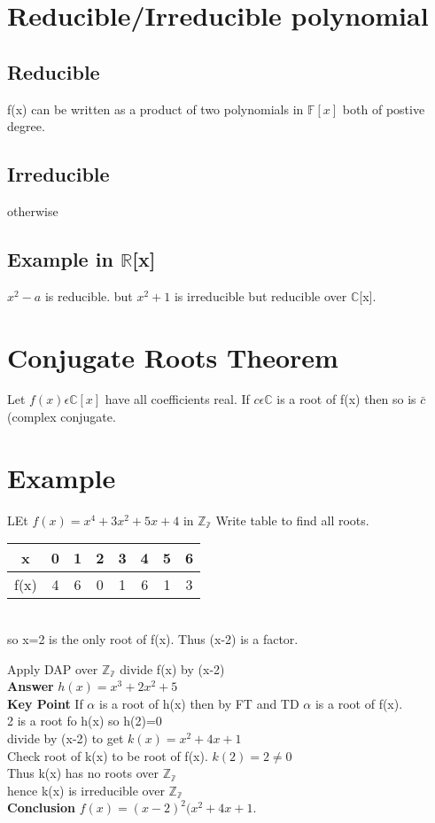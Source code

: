\documentclass{article}
\begin{document}
\section{Reducible/Irreducible polynomial}
\subsection{Reducible}
f(x) can be written as a product of two polynomials in $\mathbb{F}[x]$ both of
postive degree.
\subsection{Irreducible}
otherwise
\subsection{Example in $\mathbb{R}$[x]}
$x^2-a$ is reducible. but $x^2+1$ is irreducible but reducible over $\mathbb{C}$[x].
\section{Conjugate Roots Theorem}
Let $f(x)\epsilon \mathbb{C}[x]$ have all coefficients real. If $c\epsilon \mathbb{C}$  is a root of f(x) then so is $\bar{c}$(complex conjugate.
\section{Example}
LEt $f(x)=x^4+3x^2+5x+4$ in $\mathbb{Z_7}$
Write table to find all roots.\\
\begin{tabular}{|c|c|c|c|c|c|c|c|}
\hline 
x & 0 & 1 & 2 & 3 & 4 & 5 & 6 \\ 
\hline 
f(x) & 4 & 6 & 0 & 1 & 6 & 1&3 \\ 
\hline 
\end{tabular} \\
so x=2 is the only root of f(x). Thus (x-2) is a factor.

Apply DAP over $\mathbb{Z_7}$ divide f(x) by (x-2)\\
\textbf{Answer} $h(x)=x^3+2x^2+5$\\
\textbf{Key Point} If $\alpha$ is a root of h(x) then by FT and TD $\alpha$ is a root of  f(x).\\
2 is a root fo h(x) so h(2)=0 \\divide by (x-2) to get $k(x)=x^2+4x+1$\\ Check root of k(x) to be root of f(x). $k(2)=2\neq 0$ \\Thus k(x) has no roots over $\mathbb{Z_7} $\\ hence k(x) is irreducible over $\mathbb{Z_7}$\\ \textbf{Conclusion} $f(x)=(x-2)^2(x^2+4x+1$. 
\end{document}
